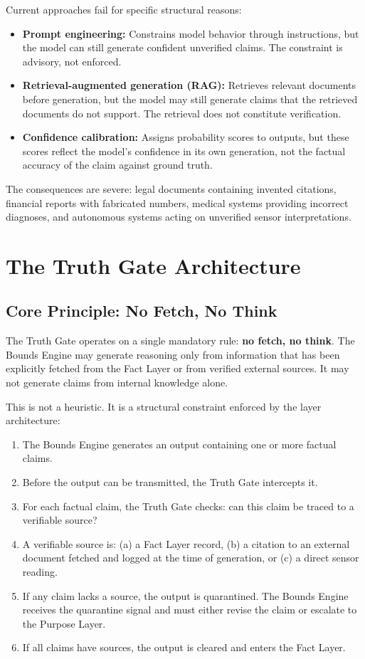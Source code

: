 \documentclass[12pt]{article}
\begin{document}
Current approaches fail for specific structural reasons:

\begin{itemize}[noitemsep]
\item \textbf{Prompt engineering:} Constrains model behavior through instructions, but the model can still generate confident unverified claims. The constraint is advisory, not enforced.
\item \textbf{Retrieval-augmented generation (RAG):} Retrieves relevant documents before generation, but the model may still generate claims that the retrieved documents do not support. The retrieval does not constitute verification.
\item \textbf{Confidence calibration:} Assigns probability scores to outputs, but these scores reflect the model's confidence in its own generation, not the factual accuracy of the claim against ground truth.
\end{itemize}

The consequences are severe: legal documents containing invented citations, financial reports with fabricated numbers, medical systems providing incorrect diagnoses, and autonomous systems acting on unverified sensor interpretations.

\section{The Truth Gate Architecture}
\label{sec:architecture}

\subsection{Core Principle: No Fetch, No Think}

The Truth Gate operates on a single mandatory rule: \textbf{no fetch, no think}. The Bounds Engine may generate reasoning only from information that has been explicitly fetched from the Fact Layer or from verified external sources. It may not generate claims from internal knowledge alone.

This is not a heuristic. It is a structural constraint enforced by the layer architecture:

\begin{enumerate}
    \item The Bounds Engine generates an output containing one or more factual claims.
    \item Before the output can be transmitted, the Truth Gate intercepts it.
    \item For each factual claim, the Truth Gate checks: can this claim be traced to a verifiable source?
    \item A verifiable source is: (a) a Fact Layer record, (b) a citation to an external document fetched and logged at the time of generation, or (c) a direct sensor reading.
    \item If any claim lacks a source, the output is quarantined. The Bounds Engine receives the quarantine signal and must either revise the claim or escalate to the Purpose Layer.
    \item If all claims have sources, the output is cleared and enters the Fact Layer.
\end{enumerate}
\end{document}
